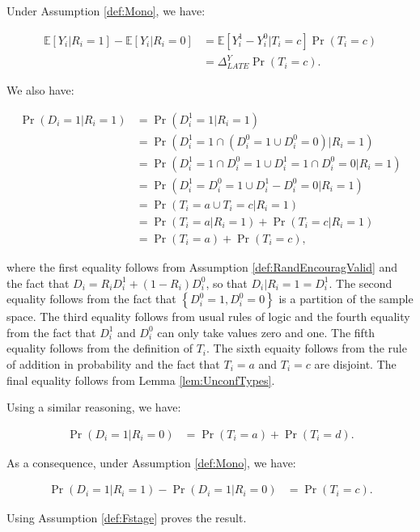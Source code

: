 \documentclass[
]{book}
\newcommand{\esp}[1]{\mathbb{E}[ #1 ]}
\theoremstyle{definition}
\theoremstyle{definition}
\theoremstyle{definition}
\theoremstyle{definition}
\theoremstyle{remark}
\begin{document}
Under Assumption \ref{def:Mono}, we have:

\begin{align*}
\esp{Y_i|R_i=1}-\esp{Y_i|R_i=0} &  = \esp{Y_i^{1}-Y_i^{0}|T_i=c}\Pr(T_i=c)\\
                                 & = \Delta^Y_{LATE}\Pr(T_i=c).
\end{align*}

We also have:

\begin{align*}
\Pr(D_i=1|R_i=1) & = \Pr(D^1_i=1|R_i=1)\\
                & =  \Pr(D^1_i=1\cap (D_i^0=1\cup D_i^0=0) |R_i=1)\\
                & =  \Pr(D^1_i=1\cap D_i^0=1\cup D^1_i=1\cap D_i^0=0 |R_i=1)\\
                & =  \Pr(D^1_i=D_i^0=1\cup D^1_i-D_i^0=0 |R_i=1)\\
                & =  \Pr(T_i=a\cup T_i=c |R_i=1)\\
               & =  \Pr(T_i=a|R_i=1)+\Pr(T_i=c|R_i=1)\\
               & =  \Pr(T_i=a)+\Pr(T_i=c),
\end{align*}

where the first equality follows from Assumption \ref{def:RandEncouragValid} and the fact that \(D_i=R_iD_i^1+(1-R_i)D_i^0\), so that \(D_i|R_i=1=D_i^1\).
The second equality follows from the fact that \(\left\{ D_i^0=1,D_i^0=0\right\}\) is a partition of the sample space.
The third equality follows from usual rules of logic and the fourth equality from the fact that \(D_i^1\) and \(D_i^0\) can only take values zero and one.
The fifth equality follows from the definition of \(T_i\).
The sixth equaity follows from the rule of addition in probability and the fact that \(T_i=a\) and \(T_i=c\) are disjoint.
The final equality follows from Lemma \ref{lem:UnconfTypes}.

Using a similar reasoning, we have:

\begin{align*}
\Pr(D_i=1|R_i=0) & = \Pr(T_i=a)+ \Pr(T_i=d).
\end{align*}

As a consequence, under Assumption \ref{def:Mono}, we have:

\begin{align*}
\Pr(D_i=1|R_i=1)-\Pr(D_i=1|R_i=0) & = \Pr(T_i=c).
\end{align*}

Using Assumption \ref{def:Fstage} proves the result.
\end{document}
